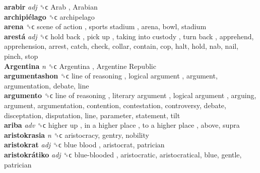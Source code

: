 \textbf{arabir} \emph{adj}  ␝ϲ   Arab ,  Arabian   \\
\textbf{archipiélago} ␝ϲ  archipelago  \\
\textbf{arena} ␝ϲ   scene of action ,  sports stadium , arena, bowl, stadium  \\
\textbf{arestá} \emph{adj}  ␝ϲ   hold back ,  pick up ,  taking into custody ,  turn back , apprehend, apprehension, arrest, catch, check, collar, contain, cop, halt, hold, nab, nail, pinch, stop  \\
\textbf{Argentina} \emph{n}  ␝ϲ   Argentina ,  Argentine Republic   \\
\textbf{argumentashon} ␝ϲ   line of reasoning ,  logical argument , argument, argumentation, debate, line  \\
\textbf{argumento} ␝ϲ   line of reasoning ,  literary argument ,  logical argument , arguing, argument, argumentation, contention, contestation, controversy, debate, disceptation, disputation, line, parameter, statement, tilt  \\
\textbf{ariba} \emph{adv}  ␝ϲ   higher up ,  in a higher place ,  to a higher place , above, supra  \\
\textbf{aristokrasia} \emph{n}  ␝ϲ  aristocracy, gentry, nobility  \\
\textbf{aristokrat} \emph{adj}  ␝ϲ   blue blood , aristocrat, patrician  \\
\textbf{aristokrátiko} \emph{adj}  ␝ϲ   blue-blooded , aristocratic, aristocratical, blue, gentle, patrician  \\

